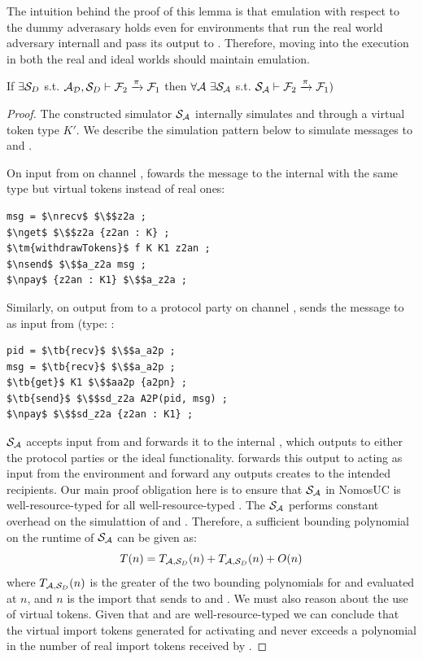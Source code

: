 The intuition behind the proof of this lemma is that emulation with respect to the dummy adverasary holds even for environments that run the real world adversary internall and pass its output to \DS. 
Therefore, moving \A into the execution in both the real and ideal worlds should maintain emulation.

\begin{theorem}\label{thm:dummy}
If $\exists \mathcal{S}_{D}$ s.t. $ \mathcal{A}_\mathcal{D}, \mathcal{S}_{D} \vdash \mathcal{F}_2 \xrightarrow{\pi} \mathcal{F}_1$ then $\forall \mathcal{A} \ \exists \mathcal{S}_\mathcal{A}$ s.t. $\mathcal{S}_{\mathcal{A}} \vdash  \mathcal{F}_2 \xrightarrow{\pi} \mathcal{F}_1)$ 
\end{theorem}

\begin{proof}
The constructed simulator $\mathcal{S}_\mathcal{A}$ internally simulates \DS and \A through a virtual token type $K'$. 
We describe the simulation pattern below to simulate messages to \DS and \A.

On  input from \Z on channel , \Sim fowards the message to the internal \A with the same type but virtual tokens instead of real ones:
\begin{lstlisting}[basicstyle=\small\BeraMonottFamily, frame=single,  mathescape, label={lst:sim}]
msg = $\nrecv$ $\$$z2a ;
$\nget$ $\$$z2a {z2an : K} ;
$\tm{withdrawTokens}$ f K K1 z2an ;
$\nsend$ $\$$a_z2a msg ;
$\npay$ {z2an : K1} $\$$a_z2a ; 
\end{lstlisting}

Similarly, on  output from \A to a protocol party on channel , \Sim sends the message to \DS as input from \Z (type: :
\begin{lstlisting}[basicstyle=\small\BeraMonottFamily, frame=single,  mathescape]
pid = $\tb{recv}$ $\$$a_a2p ;
msg = $\tb{recv}$ $\$$a_a2p ;
$\tb{get}$ K1 $\$$aa2p {a2pn} ;
$\tb{send}$ $\$$sd_z2a A2P(pid, msg) ;
$\npay$ $\$$sd_z2a {z2an : K1} ;
\end{lstlisting}

$\mathcal{S}_\mathcal{A}$ accepts input from \Z and forwards it to the internal \A, which outputs to either the protocol parties or the ideal functionality. 
\Sim forwards this output to \DS acting as input from the environment  and forward any outputs \DS creates to the intended recipients.
Our main proof obligation here is to ensure that $\mathcal{S}_{\mathcal{A}}$ in NomosUC is well-resource-typed for all well-resource-typed \A.
The $\mathcal{S}_\mathcal{A}$ performs constant overhead on the simulattion of \A and \DS. Therefore, a sufficient bounding polynomial on the runtime of $\mathcal{S}_\mathcal{A}$ can be given as:
\[
T(n) = T_{\mathcal{A},\mathcal{S}_{D}}(n) + T_{\mathcal{A},\mathcal{S}_{D}}(n) + O(n)
\]
where $T_{\mathcal{A},\mathcal{S}_{D}}(n)$ is the greater of the two bounding polynomials for \DS and \A evaluated at $n$, and $n$ is the import that \Z sends to \A and \Sim. 
We must also reason about the use of virtual tokens.
Given that \A and \DS are well-resource-typed we can conclude that the virtual import tokens generated for activating \A and \DS never exceeds a polynomial in the number of real import tokens received by \Sim. 
\end{proof}

